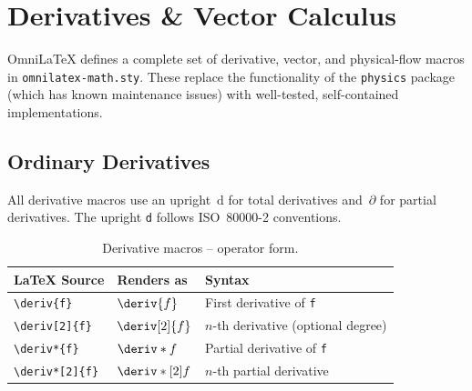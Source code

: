\chapter{Derivatives \& Vector Calculus}
\label{ch:derivatives}

OmniLaTeX defines a complete set of derivative, vector, and physical-flow
macros in \texttt{omnilatex-math.sty}.  These replace the functionality
of the \texttt{physics} package (which has known maintenance issues) with
well-tested, self-contained implementations.

\section{Ordinary Derivatives}

All derivative macros use an upright~$\mathup{d}$ for total derivatives
and~$\partial$ for partial derivatives.  The upright \texttt{d} follows
ISO~80000-2 conventions.

\begin{table}[htbp]
  \centering
  \caption{Derivative macros -- operator form.}
  \label{tab:deriv-operators}
  \begin{tabular}{@{}llp{}@{}}
    \toprule
    LaTeX Source & Renders as & Syntax \\
    \midrule
    \texttt{\textbackslash deriv\{f\}}              & $\deriv{f}$      & First derivative of \texttt{f} \\
    \texttt{\textbackslash deriv[2]\{f\}}           & $\deriv[2]{f}$   & $n$-th derivative (optional degree) \\
    \texttt{\textbackslash deriv*\{f\}}             & $\deriv*{f}$     & Partial derivative of \texttt{f} \\
    \texttt{\textbackslash deriv*[2]\{f\}}          & $\deriv*[2]{f}$  & $n$-th partial derivative \\
    \bottomrule
  \end{tabular}
\end{table}

